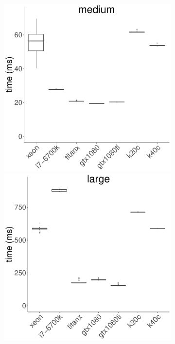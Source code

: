 \documentclass[../document.tex]{subfiles}
\begin{document}
\begin{figure}
\begin{subfigure}{0.9\textwidth}
		\includegraphics[width=\plotwidth]{figures/time-results/generate_lud_medium_boxplot-1}
		\includegraphics[width=\plotwidth]{figures/time-results/generate_lud_large_boxplot-1}
	\end{subfigure}


\end{figure}
\end{document}
